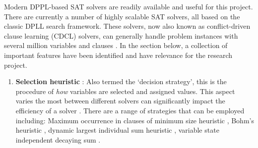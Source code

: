\documentclass[11pt, a4paper, oneside]{report} %
\begin{document}
Modern DPPL-based SAT solvers are readily available and useful for this project. There are currently
a number of highly scalable SAT solvers, all based on the classic DPLL search framework. These
solvers, now also known as conflict-driven clause learning (CDCL) solvers, can generally handle
problem instances with several million variables and clauses \cite{katebi2011empirical}. In the
section below, a collection of important features have been identified and have relevance for the
research project.

\begin{enumerate}


  \item \textbf{Selection heuristic} : \indent Also termed the `decision strategy', this is the
procedure of \textit{how} variables are selected and assigned values. This aspect varies the most
between different solvers can significantly impact the efficiency of a solver
\cite{marques1999impact,gomes2008satisfiability, zhang2002quest}. There are a range of strategies
that can be employed including: Maximum occurrence in clauses of minimum size heuristic
\cite{jeroslow1990solving}, Bohm's heuristic \cite{marques1999impact}, dynamic largest individual
sum heuristic \cite{marques1999grasp}, variable state independent decaying sum
\cite{moskewicz2001chaff}.







\end{enumerate}
\end{document}
